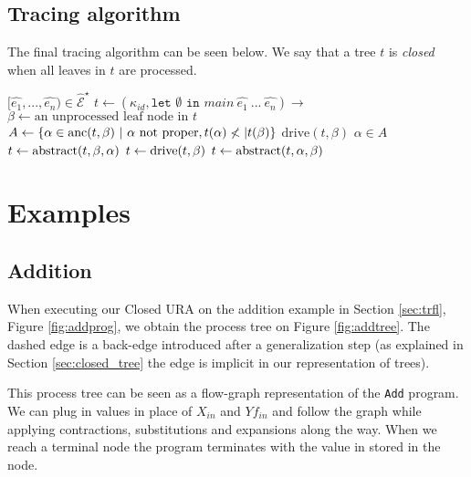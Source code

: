 \documentclass[10pt]{../sigplanconf}
\newcommand{\anc}{\ensuremath{{\rm anc}}}
\newcommand{\gen}{\ensuremath{~{\leq\kern-6pt \raisebox{1pt}{$\cdot$}}~}}
\begin{document}
\subsection{Tracing algorithm}
The final tracing algorithm can be seen below. We say that a tree $t$
is \emph{closed} when all leaves in $t$ are processed.
\begin{algorithmic}
   $[\widehat{e_1}, ..., \widehat{e_n}) \in \widehat{\mathcal{E}}^\star$
  \STATE $t\gets (\kappa_{id}, \texttt{let $\emptyset$ in $main~\widehat{e_1}~...~\widehat{e_n}$})\rightarrow$
    \STATE $\beta\gets\text{an unprocessed leaf node in $t$}$
    \STATE $A\gets\{ \alpha\in\anc(t,\beta) ~|~ \alpha\text{ not proper}, t(\alpha) \not<| t(\beta)  \}$
      \STATE $\textrm{drive}(t,\beta)$
    \ELSE
      $\alpha \in A$
      \IF{$t_\mathcal{L}(\alpha) \gen t_\mathcal{L}(\beta)$}
       \STATE $t\gets {\rm abstract}(t,\beta,\alpha)$
        \STATE $t\gets {\rm drive}(t,\beta)$
      \ELSE
        \STATE $t\gets {\rm abstract}(t,\alpha,\beta)$
      \ENDIF
    \ENDIF
  \ENDWHILE
\end{algorithmic}



\section{Examples}
\subsection{Addition}
When executing our Closed URA on the addition example in Section
\ref{sec:trfl}, Figure \ref{fig:addprog}, we obtain the process tree
on Figure \ref{fig:addtree}. The dashed edge is a back-edge introduced
after a generalization step (as explained in Section
\ref{sec:closed_tree} the edge is implicit in our representation
of trees).

This process tree can be seen as a flow-graph representation of the
\texttt{Add} program. We can plug in values in place of $X_{in}$ and
$Yf_{in}$ and follow the graph while applying contractions,
substitutions and expansions along the way. When we reach a terminal
node the program terminates with the value in stored in the node.
\end{document}
